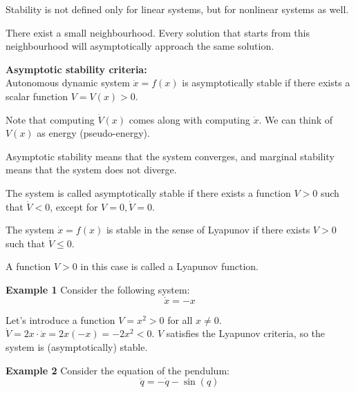 Stability is not defined only for linear systems, but for nonlinear systems as well.

There exist a small neighbourhood. Every solution that starts from this neighbourhood will asymptotically approach the same solution. 

\textbf{Asymptotic stability criteria:}\\
Autonomous dynamic system $\dot x = f(x)$ is asymptotically stable if there exists a scalar function $V = V(x) > 0$. 


Note that computing $\dot V(x)$ comes along with computing $\dot x$. 
We can think of $V(x)$ as energy (pseudo-energy).

Asymptotic stability means that the system converges, and marginal stability means that the system does not diverge. 


\begin{tcolorbox}[colback=blue!10,colframe=blue!50!black,title=\textbf{Asymptotic stability}]
The system is called asymptotically stable if there exists a function $V > 0$ such that $\dot{V} < 0$, except for $V = 0, \dot{V} = 0$. 
\end{tcolorbox}

\begin{tcolorbox}[colback=green!10,colframe=green!50!black,title=\textbf{Marginal stability}]
The system $\dot{x} = f(x)$ is stable in the sense of Lyapunov if there exists $V > 0$ such that $\dot{V} \leq 0$. 
\end{tcolorbox}

\begin{tcolorbox}[colback=red!10,colframe=red!50!black,title=\textbf{Lyapunov function}]
A function $V > 0$ in this case is called a Lyapunov function. 
\end{tcolorbox}



\textbf{Example 1}
Consider the following system:
\[\dot{x} = -x\]

Let's introduce a function $V = x^2 > 0$ for all $x \neq 0$. $\dot{V} = 2x \cdot \dot{x} = 2x (-x) = -2x^2 < 0$. 
$V$ satisfies the Lyapunov criteria, so the system is (asymptotically) stable. 

\textbf{Example 2}
Consider the equation of the pendulum:
\[\ddot{q} = -\dot{q} - \sin(q)\]


